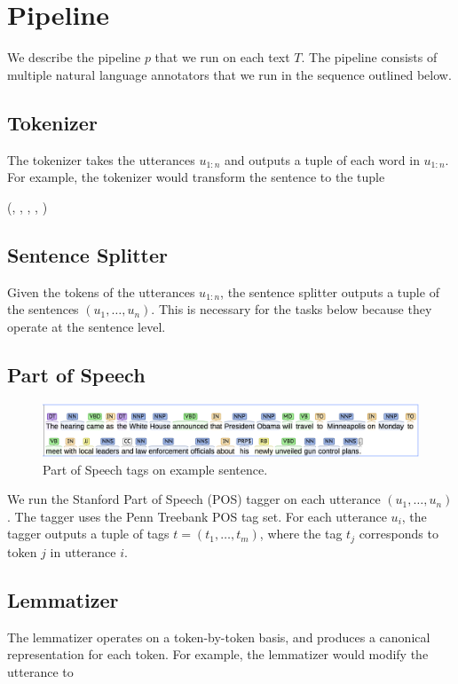 
\section{Pipeline}
We describe the pipeline $p$ that we run on each text $T$. The pipeline
consists of multiple natural language annotators that we run in 
the sequence outlined below.
\citep{manning2014stanford}

\subsection{Tokenizer}
The tokenizer takes the utterances $u_{1:n}$ and outputs a tuple of
each word in $u_{1:n}$. For example, the tokenizer would transform
the sentence  to the tuple
\begin{center}
  (, , , , )
\end{center}
\subsection{Sentence Splitter}
Given the tokens of the utterances $u_{1:n}$, the sentence splitter outputs
a tuple of the sentences $(u_1,\dots,u_n)$. This is necessary
for the tasks below because they operate at the sentence level.

\subsection{Part of Speech}

\begin{figure}
\includegraphics[scale=0.33]{figures/pos.png}
\caption{
\label{fig:pos}
Part of Speech tags on example sentence.
}
\end{figure}

We run the Stanford Part of Speech (POS) tagger \citep{toutanova2003tagger}
on each utterance $(u_1,\dots,u_n)$. The tagger uses the Penn Treebank
POS tag set. For each utterance $u_i$, the
tagger outputs a tuple of tags $t=(t_1,\dots,t_m)$, where the 
tag $t_j$ corresponds to token $j$ in utterance $i$.

\subsection{Lemmatizer}
The lemmatizer operates on a token-by-token basis, and 
produces a canonical representation for each token. For 
example, the lemmatizer would modify the utterance
 to 

